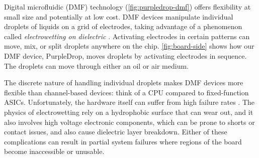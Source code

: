 \documentclass{jpaper}
\begin{document}
Digital microfluidic (DMF) technology (\autoref{fig:purpledrop-dmf}) offers flexibility at small size and potentially at low cost.
DMF devices manipulate individual droplets of liquids on a grid of electrodes, taking advantage of a phenomenon called \emph{electrowetting on dielectric} \cite{pollack2000electrowetting}.
Activating electrodes in certain patterns can move, mix, or split droplets anywhere on the chip.
\autoref{fig:board-side} shows how our DMF device, PurpleDrop, moves droplets by activating electrodes in sequence.
The droplets can move through either an oil or air medium.

The discrete nature of handling individual droplets makes DMF devices more flexible than channel-based devices: think of a CPU compared to fixed-function ASICs.
Unfortunately, the hardware itself can suffer from high failure rates \cite{dmf-review}.
The physics of electrowetting rely on a hydrophobic surface that can wear out, and it also involves high voltage electronic components, which can be prone to shorts or contact issues, and also cause dielectric layer breakdown.
Either of these complications can result in partial system failures where regions of the board become inaccessible or unusable.
\end{document}
